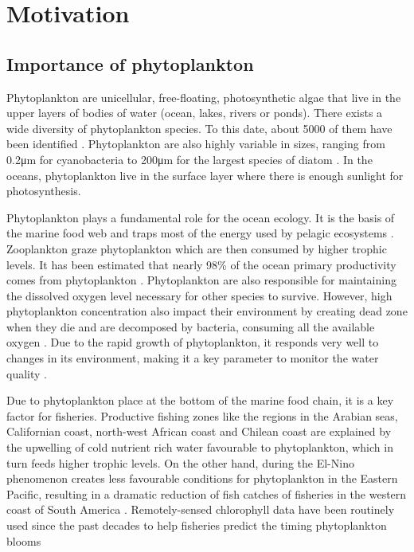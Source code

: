 \chapter{Motivation}

\section{Importance of phytoplankton}

Phytoplankton are unicellular, free-floating, photosynthetic algae that live in the upper layers of bodies of water (ocean, lakes, rivers or ponds). There exists a wide diversity of phytoplankton species. To this date, about 5000 of them have been identified \cite{Tett1995}. Phytoplankton are also highly variable in sizes, ranging from 0.2μm for cyanobacteria to 200μm for the largest species of diatom \cite{Pal2014}. In the oceans, phytoplankton live in the surface layer where there is enough sunlight for photosynthesis. 

Phytoplankton plays a fundamental role for the ocean ecology. It is the basis of the marine food web and traps most of the energy used by pelagic ecosystems \cite{Pal2014}. Zooplankton graze phytoplankton which are then consumed by higher trophic levels. It has been estimated that nearly 98\% of the ocean primary productivity comes from phytoplankton \cite{Pal2014}. Phytoplankton are also responsible for maintaining the dissolved oxygen level necessary for other species to survive. However, high phytoplankton concentration also impact their environment by creating dead zone when they die and are decomposed by bacteria, consuming all the available oxygen \cite{Pal2014}. Due to the rapid growth of phytoplankton, it responds very well to changes in its environment, making it a key parameter to monitor the water quality \cite{Wu2014}.

Due to phytoplankton place at the bottom of the marine food chain, it is a key factor for fisheries. Productive fishing zones like the regions in the Arabian seas, Californian coast, north-west African coast and Chilean coast are explained by the upwelling of cold nutrient rich water favourable to phytoplankton, which in turn feeds higher trophic levels. On the other hand, during the El-Nino phenomenon creates less favourable conditions for phytoplankton in the Eastern Pacific, resulting in a dramatic reduction of fish catches of fisheries in the western coast of South America \cite{Robinson2010}. Remotely-sensed chlorophyll data have been routinely used since the past decades to help fisheries predict the timing phytoplankton blooms \cite{Robinson2010}

